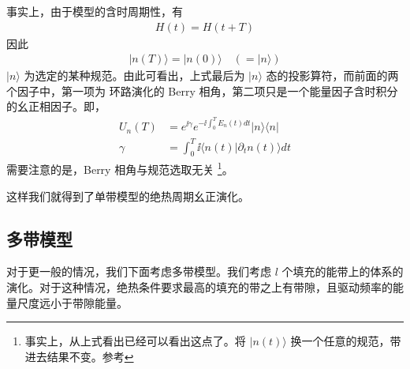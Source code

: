 事实上，由于模型的含时周期性，有
\begin{align}
H(t) = H(t+T)
\end{align}
因此
\begin{align}
|n(T)\rangle=|n(0)\rangle \quad (=|n\rangle)
\end{align}
$|n\rangle$ 为选定的某种规范。由此可看出，上式最后为 $|n\rangle$ 态的投影算符，而前面的两个因子中，第一项为 环路演化的 Berry 相角\cite{niu2010}，第二项只是一个能量因子含时积分的幺正相因子。即，
\begin{align*}
U_n(T) &= e^{\ii\gamma}e^{-\ii\int_0^TE_n(t)dt}|n\rangle\langle n|\\
\gamma &=\int_0^T\ii\langle n(t)|\partial_tn(t)\rangle dt
\end{align*}
需要注意的是，Berry 相角与规范选取无关
\footnote{事实上，从上式看出已经可以看出这点了。将 $|n(t)\rangle$ 换一个任意的规范，带进去结果不变。参考}。

这样我们就得到了单带模型的绝热周期幺正演化。



\subsection{多带模型}\label{sec:adiab:multi}

对于更一般的情况，我们下面考虑多带模型。我们考虑 $l$ 个填充的能带上的体系的演化。对于这种情况，绝热条件要求最高的填充的带之上有带隙，且驱动频率的能量尺度远小于带隙能量。

